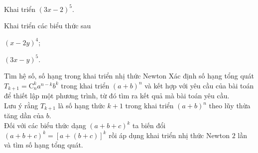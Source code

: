 \begin{vd}%
	Khai triển $(3x-2)^5$.
\end{vd}
\begin{vd}%
	Khai triển các biểu thức sau
	\begin{listEX}[2]
		\item $(x-2y)^4$;
		\item $(3x-y)^5$.
	\end{listEX}
\end{vd}
\begin{dang}{Tìm hệ số, số hạng trong khai triển nhị thức Newton}
	Xác định số hạng tổng quát $T_{k+1}=\mathrm{C}_n^ka^{n-k}b^k$ trong khai triển $\left(a+b\right)^n$ và kết hợp với yêu cầu của bài toán để thiết lập một phương trình, từ đó tìm ra kết quả mà bài toán yêu cầu.\\
	Lưu ý rằng $T_{k+1}$ là số hạng thức $k+1$ trong khai triển $\left(a+b\right)^n$ theo lũy thừa tăng dần của $b$.\\
	Đối với các biểu thức dạng $(a+b+c)^k$ ta biến đổi $(a+b+c)^k=\left[a+(b+c)\right]^k$ rồi áp dụng khai triển nhị thức Newton $2$ lần và tìm số hạng tổng quát.
\end{dang}
